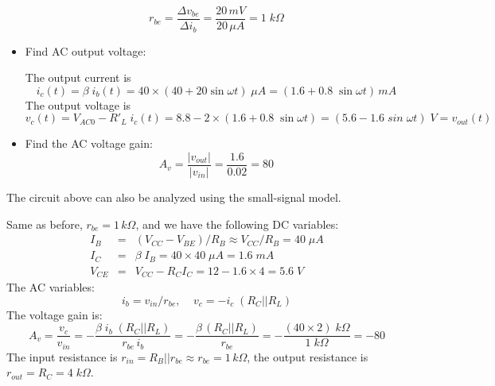 \documentclass{article}
\begin{document}
\begin{itemize}
  \begin{equation}
  r_{be}=\frac{\Delta v_{be}}{\Delta i_b} =\frac{20\,mV}{20\,\mu A}=1\;k\Omega
  \end{equation}

\item Find AC output voltage: 

  The output current is
  \begin{equation}
  i_c(t)=\beta\; i_b(t)=40\times(40+20\sin\omega t)\;\mu A
  =(1.6+ 0.8 \;\sin\omega t)\,mA
  \end{equation}
  The output voltage is
  \begin{equation} 
  v_c(t)=V_{AC0}-R'_L\;i_c(t)=8.8-2\times(1.6+0.8\;\sin\omega t)
  =(5.6-1.6 \;sin\;\omega t)\;V=v_{out}(t)
  \end{equation}

\item Find the AC voltage gain:
  \begin{equation}
  A_v=\frac{|v_{out}|}{|v_{in}|}=\frac{1.6}{0.02}=80	
\end{equation}
\end{itemize}


The circuit above can also be analyzed using the small-signal model. 


Same as before, $r_{be}=1 \,k\Omega$, and we have the following DC variables:
\begin{eqnarray}
  I_B&=&(V_{CC}-V_{BE})/R_B \approx V_{CC}/R_B=40 \;\mu A	
  \nonumber \\
  I_C&=&\beta\;I_B=40\times 40\;\mu A=1.6\;mA	
  \nonumber \\
  V_{CE}&=&V_{CC}-R_C I_C=12-1.6\times 4=5.6\;V	
\end{eqnarray}
The AC variables:
\begin{equation}
i_b=v_{in}/r_{be}, \;\;\;\;v_c=-i_c\; (R_C||R_L)
\end{equation}
The voltage gain is:
\begin{equation}
A_v=\frac{v_c}{v_{in}}=-\frac{\beta\; i_b\;(R_C||R_L)}{r_{be}\,i_b}
=-\frac{\beta\,(R_C||R_L)}{r_{be}}
=-\frac{(40\times 2)\;k\Omega}{1\;k\Omega}=-80	
\end{equation}
The input resistance is $r_{in}=R_B||r_{be}\approx r_{be}=1\,k\Omega$,
the output resistance is $r_{out}=R_C=4\;k\Omega$.
\end{document}

